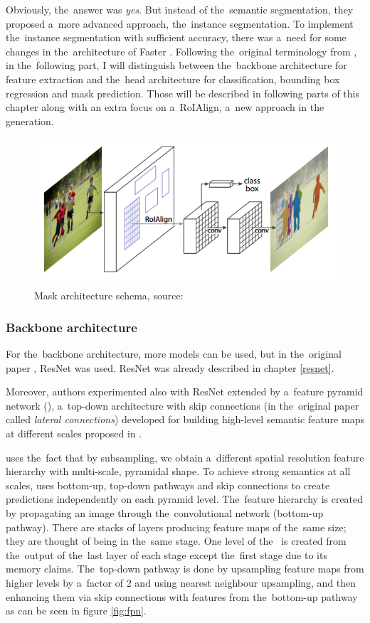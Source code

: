 Obviously, the~answer was \textit{yes}. But instead of the~semantic 
segmentation, they proposed a~more advanced approach, the~instance segmentation. 
To implement the~instance segmentation with sufficient accuracy, there was
a~need for some changes in the~architecture of Faster . Following
the~original terminology from \cite{mask-rcnn}, in the~following part, I will 
distinguish between the~backbone architecture for feature extraction and
the~head architecture for classification, bounding box regression and mask 
prediction. Those will be described in following parts of this chapter along 
with an extra focus on a~RoIAlign, a~new approach in the~ generation.

\begin{figure}[H]
   \centering
	\includegraphics[width=0.4\linewidth]{./pictures/maskrcnn.png}
	\caption[Mask R-CNN architecture]{Mask  architecture schema, source: 
\cite{mask-rcnn}}
      \label{fig:mask-rcnn}
\end{figure}

\subsubsection{Backbone architecture}
\label{backbone}

For the~backbone architecture, more models can be used, but in the~original 
paper \cite{mask-rcnn}, ResNet was used. ResNet was already described in chapter 
\ref{resnet}.

Moreover, authors experimented also with ResNet extended by a~feature pyramid 
network (), a~top-down architecture with skip connections (in
the~original paper called \textit{lateral connections}) developed for building 
high-level semantic feature maps at different scales proposed in \cite{fpn}.

 uses the~fact that by subsampling, we obtain a~different spatial 
resolution feature hierarchy with multi-scale, pyramidal shape. To achieve 
strong semantics at all scales,  uses bottom-up, top-down pathways and 
skip connections to create predictions independently on each pyramid level.
The~feature hierarchy is created by propagating an image through the~convolutional 
network (bottom-up pathway). There are stacks of layers producing feature maps 
of the~same size; they are thought of being in the~same stage. One level of
the~ is created from the~output of the~last layer of each stage except
the~first stage due to its memory claims. The~top-down pathway is done by upsampling 
feature maps from higher levels by a~factor of 2 and using nearest neighbour 
upsampling, and then enhancing them via skip connections with features from
the~bottom-up pathway as can be seen in figure \ref{fig:fpn}.

